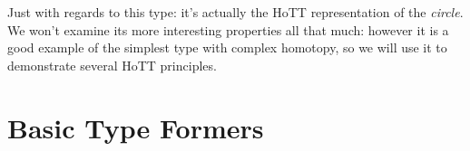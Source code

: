 Just with regards to this  type: it's actually the
HoTT representation of the \emph{circle}.
We won't examine its more interesting properties all that much: however it is a
good example of the simplest type with complex homotopy, so we will use it to
demonstrate several HoTT principles.

\section{Basic Type Formers}






